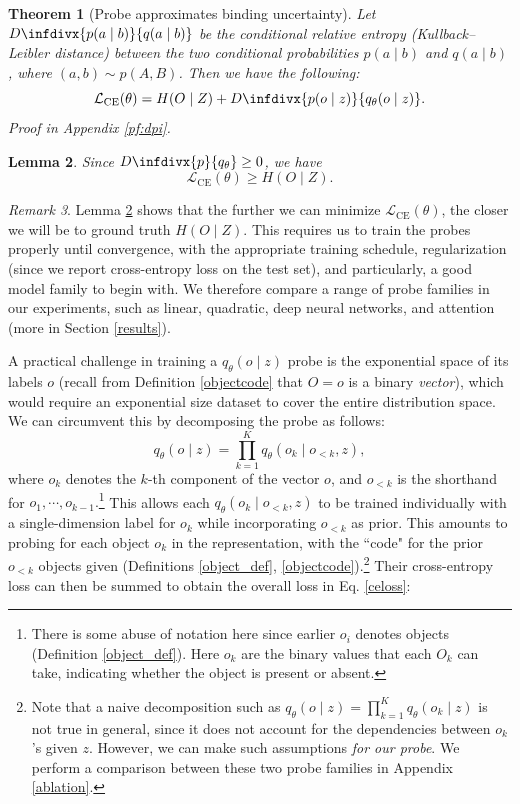 \documentclass{article}
\newcommand{\infdiv}{D\infdivx}
\theoremstyle{plain}
\newtheorem{theorem}{Theorem}[section]
\newtheorem{lemma}[theorem]{Lemma}
\theoremstyle{definition}
\theoremstyle{remark}
\newtheorem{remark}[theorem]{Remark}
\begin{document}
\begin{theorem}[Probe approximates binding uncertainty] Let $\infdiv{p(a\mid b)}{q(a\mid b)}$ be the conditional relative entropy (Kullback–Leibler distance) between the two conditional probabilities $p(a\mid b)$ and $q(a\mid b)$, where $(a,b)\sim p(A,B)$. Then we have the following:
\[\mathcal L_{\mathrm{CE}}(\theta)=H(O\mid Z)+\infdiv{p(o\mid z)}{q_{\theta}(o\mid z)}.
\]\label{probeapprox}
Proof in Appendix \ref{pf:dpi}.
\end{theorem}
\begin{lemma}
    Since $\infdiv{p}{q_\theta}\geq 0$, we have 
    \[
    \mathcal L_{\mathrm{CE}}(\theta)\geq H(O\mid Z).
    \]\label{bound}
\end{lemma}
\begin{remark}
    Lemma \ref{bound} shows that the further we can minimize $\mathcal{L}_{\mathrm{CE}}(\theta)$, the closer we will be to ground truth $H(O\mid Z)$. This requires us to train the probes properly until convergence, with the appropriate training schedule, regularization (since we report cross-entropy loss on the test set), and particularly, a good model family to begin with. We therefore compare a range of probe families in our experiments, such as linear, quadratic, deep neural networks, and attention (more in Section \ref{results}). \label{mini}
\end{remark}
A practical challenge in training a $q_\theta(o\mid z)$ probe is the exponential space of its labels $o$ (recall from Definition \ref{objectcode} that $O=o$ is a binary \textit{vector}), which would require an exponential size dataset to cover the entire distribution space. We can circumvent this by decomposing the probe as follows:
\begin{equation}
q_\theta(o\mid z)
=
\prod_{k=1}^K q_{\theta}(o_k\mid o_{<k},z)
, \label{autoreg}
\end{equation}
where $o_k$ denotes the $k$-th component of the vector $o$, and $o_{<k}$ is the shorthand for $o_1,\cdots,o_{k-1}.$\footnote{There is some abuse of notation here since earlier $o_i$ denotes objects (Definition \ref{object_def}). Here $o_k$ are the binary values that each $O_k$ can take, indicating whether the object is present or absent.} This allows each $q_{\theta}(o_k\mid o_{<k},z)$ to be trained individually with a single-dimension label for $o_k$ while incorporating $o_{<k}$ as prior. This amounts to probing for each object $o_k$ in the representation, with the ``code" for the prior $o_{<k}$ objects given (Definitions \ref{object_def}, \ref{objectcode}).\footnote{Note that a naive decomposition such as $q_\theta(o\mid z)
=
\prod_{k=1}^K q_\theta(o_k\mid z)$ is not true in general, since it does not account for the dependencies between $o_k$'s given $z$. However, we can make such assumptions \textit{for our probe}. We perform a comparison between these two probe families in Appendix \ref{ablation}.} Their cross-entropy loss can then be summed to obtain the overall loss in Eq. \eqref{celoss}:
\end{document}
